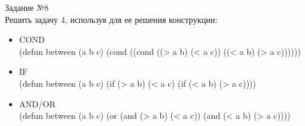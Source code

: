 {\LARGE Задание №8}\\

Решить задачу 4, используя для ее решения конструкции:
\begin{itemize}
\item COND\\
(defun between (a b c) (cond ((cond ((> a b) (< a c)) ((< a b) (> a c))))))
\item IF\\
(defun between (a b c) (if (> a b) (< a c) (if (< a b) (> a c))))
\item AND/OR\\
(defun between (a b c) (or (and (> a b) (< a c)) (and (< a b) (> a c))))
\end{itemize}
